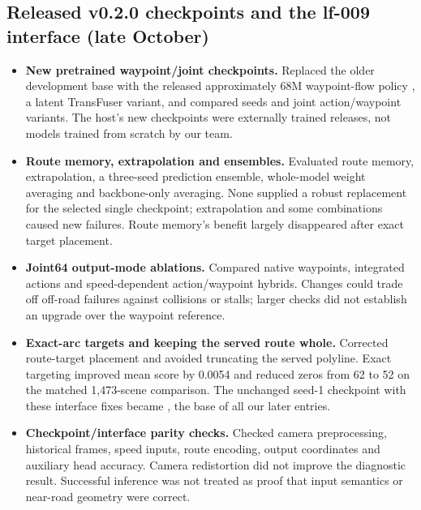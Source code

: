 \subsection{Released v0.2.0 checkpoints and the lf-009 interface (late October)}
\begin{itemize}\setlength{\itemsep}{3pt}\setlength{\parsep}{0pt}\setlength{\parskip}{0pt}\setlength{\topsep}{3pt}
\item \textbf{New pretrained waypoint/joint checkpoints.} Replaced the older development base with the released approximately 68M waypoint-flow policy \cite{weights}, a latent TransFuser \cite{transfuser} variant, and compared seeds and joint action/waypoint variants. The host's new checkpoints were externally trained releases, not models trained from scratch by our team.
\item \textbf{Route memory, extrapolation and ensembles.} Evaluated route memory, extrapolation, a three-seed prediction ensemble, whole-model weight averaging \cite{soups} and backbone-only averaging. None supplied a robust replacement for the selected single checkpoint; extrapolation and some combinations caused new failures. Route memory's benefit largely disappeared after exact target placement.
\item \textbf{Joint64 output-mode ablations.} Compared native waypoints, integrated actions and speed-dependent action/waypoint hybrids. Changes could trade off off-road failures against collisions or stalls; larger checks did not establish an upgrade over the waypoint reference.
\item \textbf{Exact-arc targets and keeping the served route whole.} Corrected route-target placement and avoided truncating the served polyline. Exact targeting improved mean score by 0.0054 and reduced zeros from 62 to 52 on the matched 1,473-scene comparison. The unchanged seed-1 checkpoint with these interface fixes became \lf{}, the base of all our later entries.
\item \textbf{Checkpoint/interface parity checks.} Checked camera preprocessing, historical frames, speed inputs, route encoding, output coordinates and auxiliary head accuracy. Camera redistortion did not improve the diagnostic result. Successful inference was not treated as proof that input semantics or near-road geometry were correct.
\end{itemize}

